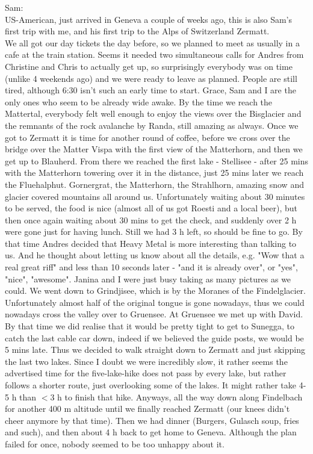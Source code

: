 Sam:\\
US-American, just arrived in Geneva a couple of weeks ago, this is also Sam's first trip with me, and his first trip to the Alps of Switzerland Zermatt.\\

We all got our day tickets the day before, so we planned to meet as usually in a cafe at the train station. Seems it needed two simultaneous calls for Andres from Christine and Chris to actually get up, so surprisingly everybody was on time (unlike 4 weekends ago) and we were ready to leave as planned. People are still tired, although 6:30 isn't such an early time to start. Grace, Sam and I are the only ones who seem to be already wide awake. By the time we reach the Mattertal, everybody felt well enough to enjoy the views over the Bisglacier and the remnants of the rock avalanche by Randa, still amazing as always. Once we got to Zermatt it is time for another round of coffee, before we cross over the bridge over the Matter Vispa with the first view of the Matterhorn, and then we get up to Blauherd. From there we reached the first lake - Stellisee - after 25 mins with the Matterhorn towering over it in the distance, just 25 mins later we reach the Fluehalphut. Gornergrat, the Matterhorn, the Strahlhorn, amazing snow and glacier covered mountains all around us. Unfortunately waiting about 30 minutes to be served, the food is nice (almost all of us got Roesti and a local beer), but then once again waiting about 30 mins to get the check, and suddenly over 2 h were gone just for having lunch. Still we had 3 h left, so should be fine to go.  By that time Andres decided that Heavy Metal is more interesting than talking to us. And he thought about letting us know about all the details, e.g. "Wow that a real great riff" and less than 10 seconds later - "and it is already over", or "yes", "nice", "awesome". Janina and I were just busy taking as many pictures as we could. We went down to Grindjisee, which is by the Moranes of the Findelglacier. Unfortunately almost half of the original tongue is gone nowadays, thus we could nowadays cross the valley over to Gruensee. At Gruensee we met up with David. By that time we did realise that it would be pretty tight to get to Sunegga, to catch the last cable car down, indeed if we believed the guide posts, we would be 5 mins late. Thus we decided to walk straight down to Zermatt and just skipping the last two lakes. Since I doubt we were incredibly slow, it rather seems the advertised time for the five-lake-hike does not pass by every lake, but rather follows a shorter route, just overlooking some of the lakes. It might rather take 4-5 h than $<$3 h to finish that hike. Anyways, all the way down along Findelbach for another 400 m altitude until we finally reached Zermatt (our knees didn't cheer anymore by that time). Then we had dinner (Burgers, Gulasch soup, fries and such), and then about 4 h back to get home to Geneva. Although the plan failed for once, nobody seemed to be too unhappy about it.

